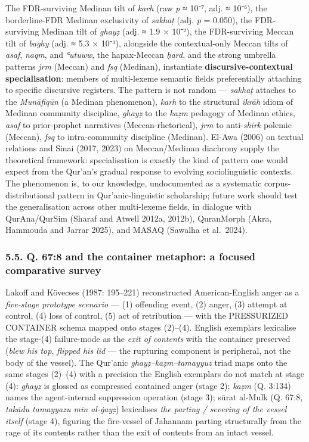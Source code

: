 The FDR-surviving Medinan tilt of \emph{karh} (raw \emph{p} ≈ 10⁻⁷, adj.
≈ 10⁻⁶), the borderline-FDR Medinan exclusivity of \emph{sakhaṭ} (adj.
\emph{p} = 0.050), the FDR-surviving Medinan tilt of \emph{ghayẓ} (adj.
≈ 1.9 × 10⁻²), the FDR-surviving Meccan tilt of \emph{baghy} (adj. ≈ 5.3
× 10⁻³), alongside the contextual-only Meccan tilts of \emph{asaf},
\emph{naqm}, and \emph{ʿutuww}, the hapax-Meccan \emph{ḥard}, and the
strong umbrella patterns \emph{jrm} (Meccan) and \emph{fsq} (Medinan),
instantiate \textbf{discursive-contextual specialisation}: members of
multi-lexeme semantic fields preferentially attaching to specific
discursive registers. The pattern is not random --- \emph{sakhaṭ}
attaches to the \emph{Munāfiqūn} (a Medinan phenomenon), \emph{karh} to
the structural \emph{ikrāh} idiom of Medinan community discipline,
\emph{ghayẓ} to the \emph{kaẓm} pedagogy of Medinan ethics, \emph{asaf}
to prior-prophet narratives (Meccan-rhetorical), \emph{jrm} to
anti-\emph{shirk} polemic (Meccan), \emph{fsq} to intra-community
discipline (Medinan). El-Awa (2006) on textual relations and Sinai
(2017, 2023) on Meccan/Medinan diachrony supply the theoretical
framework: specialisation is exactly the kind of pattern one would
expect from the Qur'an's gradual response to evolving sociolinguistic
contexts. The phenomenon is, to our knowledge, undocumented as a
systematic corpus-distributional pattern in Qur'anic-linguistic
scholarship; future work should test the generalisation across other
multi-lexeme fields, in dialogue with QurAna/QurSim (Sharaf and Atwell
2012a, 2012b), QuranMorph (Akra, Hammouda and Jarrar 2025), and MASAQ
(Sawalha et al.~2024).

\subsubsection{5.5. Q. 67:8 and the container metaphor: a focused
comparative
survey}\label{q.-678-and-the-container-metaphor-a-focused-comparative-survey}

Lakoff and Kövecses (1987: 195--221) reconstructed American-English
anger as a \emph{five-stage prototype scenario} --- (1) offending event,
(2) anger, (3) attempt at control, (4) loss of control, (5) act of
retribution --- with the PRESSURIZED CONTAINER schema mapped onto stages
(2)--(4). English exemplars lexicalise the stage-(4) failure-mode as the
\emph{exit of contents} with the container preserved (\emph{blew his
top}, \emph{flipped his lid} --- the rupturing component is peripheral,
not the body of the vessel). The Qur'anic \emph{ghayẓ--kaẓm--tamayyuz}
triad maps onto the same stages (2)--(4) with a precision the English
exemplars do not match at stage (4): \emph{ghayẓ} is glossed as
compressed contained anger (stage 2); \emph{kaẓm} (Q. 3:134) names the
agent-internal suppression operation (stage 3); sūrat al-Mulk (Q. 67:8,
\emph{takādu tamayyazu min al-ġayẓ}) lexicalises \emph{the parting /
severing of the vessel itself} (stage 4), figuring the fire-vessel of
Jahannam parting structurally from the rage of its contents rather than
the exit of contents from an intact vessel.

